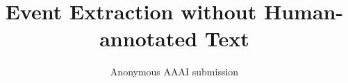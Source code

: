 \documentclass[letterpaper]{article} %
\begin{document}
%
\title{Event Extraction without Human-annotated Text}
\author{Anonymous AAAI submission}
\maketitle











\end{document}
